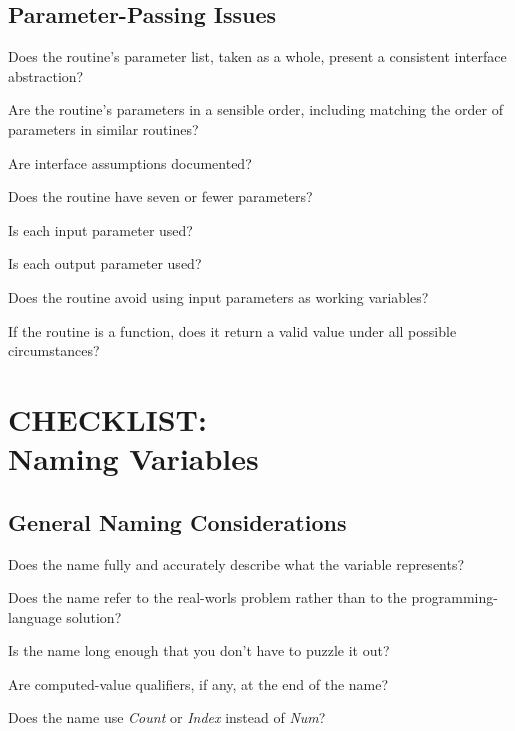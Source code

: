 \begin{multicols}{2}
\subsection*{Parameter-Passing Issues}
\begin{todolist}
  \item Does the routine's parameter list, taken as a whole, present a consistent interface abstraction?
  \item Are the routine's parameters in a sensible order, including matching the order of parameters in similar routines?
  \item Are interface assumptions documented?
  \item Does the routine have seven or fewer parameters?
  \item Is each input parameter used?
  \item Is each output parameter used?
  \item Does the routine avoid using input parameters as working variables?
  \item If the routine is a function, does it return a valid value under all possible circumstances?
\end{todolist}

\section*{CHECKLIST:\\Naming Variables}

\subsection*{General Naming Considerations}
\begin{todolist}
  \item Does the name fully and accurately describe what the variable represents?
  \item Does the name refer to the real-worls problem rather than to the programming-language solution?
  \item Is the name long enough that you don't have to puzzle it out?
  \item Are computed-value qualifiers, if any, at the end of the name?
  \item Does the name use \textit{Count} or \textit{Index} instead of \textit{Num}?
\end{todolist}


\end{multicols}
